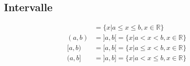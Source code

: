 \subsection{Intervalle}

\begin{align*}
[a,b]  &=  \{x| a \leq x \leq b, x \in \mathbb{R}\} \\
(a,b) &= ]a,b[ =  \{x| a <  x < b, x \in \mathbb{R}\} \\
[a,b) &= [a,b[ =  \{x| a \leq  x < b, x \in \mathbb{R}\} \\
(a,b] &= ]a,b] =  \{x| a <  x \leq b, x \in \mathbb{R}\}
 \end{align*}